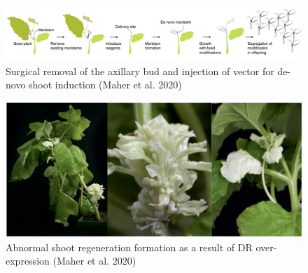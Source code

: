 \documentclass[
]{article}
\begin{document}
\begin{figure}[h]

{\centering \includegraphics[width=1\linewidth]{Bud excision} 

}

\caption{Surgical removal of the axillary bud and injection of vector for de-novo shoot induction (Maher et al. 2020)}\label{fig:Bud_Excision}
\end{figure}
\begin{figure}[h]

{\centering \includegraphics[width=1\linewidth]{Deform benthamiana PDS} 

}

\caption{Abnormal shoot regeneration formation as a result of DR over-expression (Maher et al. 2020)}\label{fig:Deform_benthamiana}
\end{figure}
\end{document}
